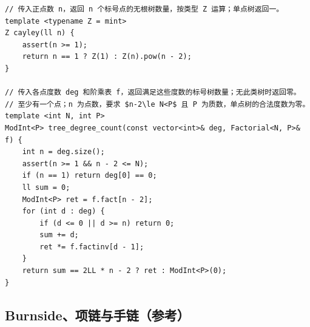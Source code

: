 \begin{lstlisting}
// 传入正点数 n，返回 n 个标号点的无根树数量，按类型 Z 运算；单点树返回一。
template <typename Z = mint>
Z cayley(ll n) {
    assert(n >= 1);
    return n == 1 ? Z(1) : Z(n).pow(n - 2);
}

// 传入各点度数 deg 和阶乘表 f，返回满足这些度数的标号树数量；无此类树时返回零。
// 至少有一个点；n 为点数，要求 $n-2\le N<P$ 且 P 为质数，单点树的合法度数为零。
template <int N, int P>
ModInt<P> tree_degree_count(const vector<int>& deg, Factorial<N, P>& f) {
    int n = deg.size();
    assert(n >= 1 && n - 2 <= N);
    if (n == 1) return deg[0] == 0;
    ll sum = 0;
    ModInt<P> ret = f.fact[n - 2];
    for (int d : deg) {
        if (d <= 0 || d >= n) return 0;
        sum += d;
        ret *= f.factinv[d - 1];
    }
    return sum == 2LL * n - 2 ? ret : ModInt<P>(0);
}
\end{lstlisting}

\subsection{Burnside、项链与手链（参考）}
\par

